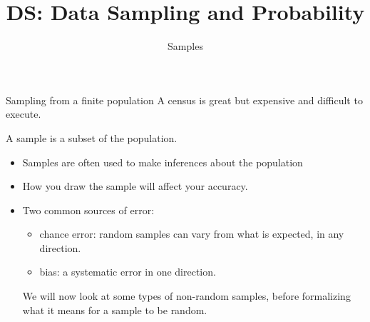 \documentclass[aspectratio=169]{../latex_main/tntbeamer}  %
\title[Introduction]{DS: Data Sampling and Probability}
\subtitle{Samples}
\begin{document}
	
	\maketitle
	
	\begin{frame}{Sampling from a finite population}
	    A census is great but expensive and difficult to execute.
     
	    \bigskip
	    \alert{A sample is a subset of the population.}
        \begin{itemize}
            \item Samples are often used to make \alert{inferences} about the population
            \item How you draw the sample will affect your accuracy.
            \item Two common sources of error:
            \begin{itemize}
                \item \alert{chance error}: random samples can vary from what is expected, in any direction.
                \item \alert{bias}: a systematic error in one direction.
            \end{itemize}
               \bigskip
               \bigskip
               We will now look at some types of \alert{non-random samples}, before formalizing what it means for a sample to be random.

        \end{itemize}
	    
	\end{frame}
	
\end{document}
